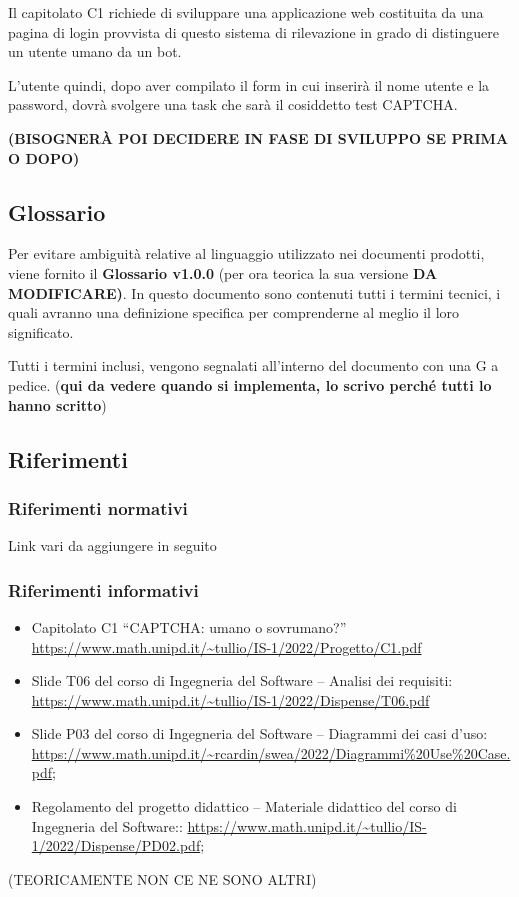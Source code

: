 Il capitolato C1 richiede di sviluppare una applicazione web costituita da una pagina di login provvista di questo sistema di rilevazione in grado di distinguere un utente umano da un bot.

L'utente quindi, dopo aver compilato il form in cui inserirà il nome utente e la password, dovrà svolgere una task che sarà il cosiddetto test CAPTCHA.

\textbf{(BISOGNERÀ POI DECIDERE IN FASE DI SVILUPPO SE PRIMA O DOPO)}

\subsection{Glossario}
Per evitare ambiguità relative al linguaggio utilizzato nei documenti prodotti, viene fornito il \textbf{Glossario v1.0.0} (per ora teorica la sua versione \textbf{DA MODIFICARE)}. In questo documento sono contenuti tutti i termini tecnici, i quali avranno una definizione specifica per comprenderne al meglio il loro significato.

Tutti i termini inclusi, vengono segnalati all'interno del documento con una G a pedice. (\textbf{qui da vedere quando si implementa, lo scrivo perché tutti lo hanno scritto})

\subsection{Riferimenti}

\subsubsection{Riferimenti normativi}
Link vari da aggiungere in seguito

\subsubsection{Riferimenti informativi}

\begin{itemize}
 	\item Capitolato C1 “CAPTCHA: umano o sovrumano?”
		\url{https://www.math.unipd.it/~tullio/IS-1/2022/Progetto/C1.pdf}
	\item Slide T06 del corso di Ingegneria del Software – Analisi dei requisiti:
		\url{https://www.math.unipd.it/~tullio/IS-1/2022/Dispense/T06.pdf}
	\item Slide P03 del corso di Ingegneria del Software – Diagrammi dei casi d'uso:
		\url{https://www.math.unipd.it/~rcardin/swea/2022/Diagrammi%20Use%20Case.pdf};
	\item Regolamento del progetto didattico – Materiale didattico del corso di Ingegneria del Software::
		\url{https://www.math.unipd.it/~tullio/IS-1/2022/Dispense/PD02.pdf};
\end{itemize}

(TEORICAMENTE NON CE NE SONO ALTRI)